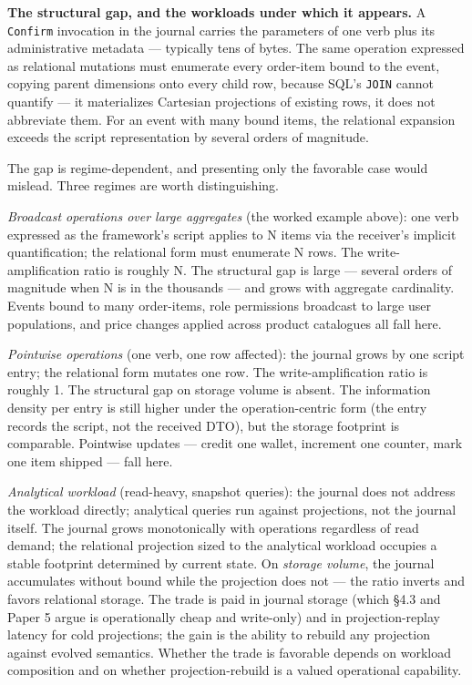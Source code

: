 \documentclass[
]{article}
\let\origtexttt\texttt%
\renewcommand{\texttt}[1]{\origtexttt{\seqsplit{#1}}}%
\let\texttt\origtexttt%
\begin{document}
\textbf{The structural gap, and the workloads under which it appears.} A
\texttt{Confirm} invocation in the journal carries the parameters of one
verb plus its administrative metadata --- typically tens of bytes. The
same operation expressed as relational mutations must enumerate every
order-item bound to the event, copying parent dimensions onto every
child row, because SQL's \texttt{JOIN} cannot quantify --- it
materializes Cartesian projections of existing rows, it does not
abbreviate them. For an event with many bound items, the relational
expansion exceeds the script representation by several orders of
magnitude.

The gap is regime-dependent, and presenting only the favorable case
would mislead. Three regimes are worth distinguishing.

\emph{Broadcast operations over large aggregates} (the worked example
above): one verb expressed as the framework's script applies to N items
via the receiver's implicit quantification; the relational form must
enumerate N rows. The write-amplification ratio is roughly N. The
structural gap is large --- several orders of magnitude when N is in the
thousands --- and grows with aggregate cardinality. Events bound to many
order-items, role permissions broadcast to large user populations, and
price changes applied across product catalogues all fall here.

\emph{Pointwise operations} (one verb, one row affected): the journal
grows by one script entry; the relational form mutates one row. The
write-amplification ratio is roughly 1. The structural gap on storage
volume is absent. The information density per entry is still higher
under the operation-centric form (the entry records the script, not the
received DTO), but the storage footprint is comparable. Pointwise
updates --- credit one wallet, increment one counter, mark one item
shipped --- fall here.

\emph{Analytical workload} (read-heavy, snapshot queries): the journal
does not address the workload directly; analytical queries run against
projections, not the journal itself. The journal grows monotonically
with operations regardless of read demand; the relational projection
sized to the analytical workload occupies a stable footprint determined
by current state. On \emph{storage volume}, the journal accumulates
without bound while the projection does not --- the ratio inverts and
favors relational storage. The trade is paid in journal storage (which
§4.3 and Paper 5 argue is operationally cheap and write-only) and in
projection-replay latency for cold projections; the gain is the ability
to rebuild any projection against evolved semantics. Whether the trade
is favorable depends on workload composition and on whether
projection-rebuild is a valued operational capability.
\end{document}
